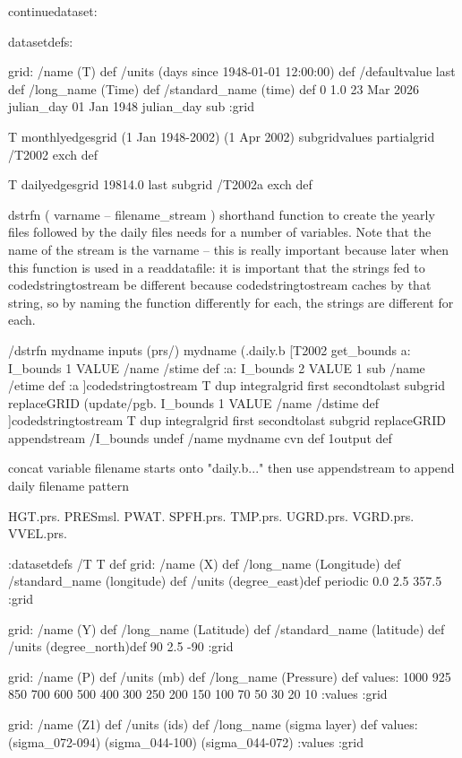 \begin{ingrid}

continuedataset:

datasetdefs:

grid:
/name (T) def
/units (days since 1948-01-01 12:00:00) def
/defaultvalue { last } def
/long_name (Time) def
/standard_name (time) def
0
1.0
23 Mar 2026 julian_day
01 Jan 1948 julian_day sub
:grid

T monthlyedgesgrid
(1 Jan 1948-2002) (1 Apr 2002) subgridvalues
partialgrid
/T2002 exch def

T dailyedgesgrid
19814.0 last subgrid
/T2002a exch def
\end{ingrid}
\word dstrfn ( varname -- filename_stream ) shorthand function to
create the yearly files followed by the daily files needs for a number
of variables.  Note that the name of the stream is the varname -- this
is really important because later when this function is used in a
readdatafile: it is important that the strings fed to
codedstringtostream be different because codedstringtostream caches by
that string, so by naming the function differently for each, the
strings are different for each. 
\begin{ingrid}
/dstrfn {
{mydname} inputs
   (prs/) mydname (.daily.b%
   [T2002 get_bounds a:
        I_bounds 1 VALUE
        /name /stime def
        :a:
         I_bounds 2 VALUE
         1 sub
         /name /etime def
         :a
       ]codedstringtostream
   T dup integralgrid
     first secondtolast subgrid
     replaceGRID
   (update/pgb.%
       I_bounds 1 VALUE
       /name /dstime def
       ]codedstringtostream
    T dup integralgrid
      first secondtolast subgrid
      replaceGRID
    appendstream
/I_bounds undef   /name mydname cvn def
1output
} def
\end{ingrid}
concat variable filename starts onto "daily.b..." then use appendstream to append daily filename pattern

HGT.prs. PRESmsl. PWAT. SPFH.prs. TMP.prs. UGRD.prs. VGRD.prs. VVEL.prs.
\begin{ingrid}
:datasetdefs
/T T def
grid:
/name (X) def
/long_name (Longitude) def
/standard_name (longitude) def
/units (degree_east)def
periodic
 0.0 2.5 357.5
:grid

grid:
/name (Y) def
/long_name (Latitude) def
/standard_name (latitude) def
/units (degree_north)def
90 2.5 -90
:grid

grid:
/name (P) def
/units (mb) def
/long_name (Pressure) def
values: 1000 925 850 700 600 500 400 300 250 200 150 100 70 50 30 20 10 :values
:grid

grid:
/name (Z1) def
/units (ids) def
/long_name (sigma layer) def
values: (sigma_072-094) (sigma_044-100) (sigma_044-072) :values
:grid
\end{ingrid}

